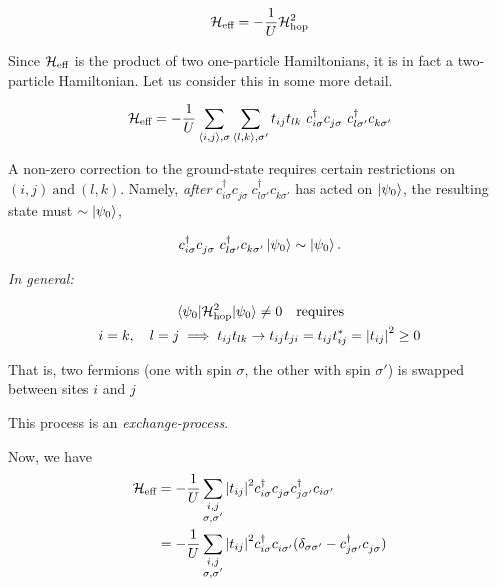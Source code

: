 \begin{equation}
    \mathcal{H}_{\text{eff}} = -\frac{1}{U} \mathcal{H}_{\text{hop}}^2
\end{equation}

Since $\mathcal{H}_{\text{eff}}$  is the product of two one-particle Hamiltonians, it is in fact a two-particle Hamiltonian. Let us consider this in some more detail.

\begin{equation}
    \mathcal{H}_{\text{eff}} = -\frac{1}{U} \sum_{\langle i, j \rangle, \sigma}  \sum_{\langle l, k \rangle , \sigma'} t_{ij} t_{lk} \ c_{i \sigma}^\dagger c_{j \sigma}^{} \ c_{l \sigma'}^\dagger c_{k \sigma'}^{}
\end{equation}

A non-zero correction to the ground-state requires certain restrictions on $(i, j) \ \text{and} \ (l,k)$. Namely, \emph{after} $c_{i \sigma}^\dagger c_{j \sigma}^{} \ c_{l \sigma'}^\dagger c_{k \sigma'}^{}$ has acted on $\ket{\psi_0}$, the resulting state must $\sim \ket{\psi_0}$,

\begin{equation}
    c_{i \sigma}^\dagger c_{j \sigma}^{} \ c_{l \sigma'}^\dagger c_{k \sigma'}^{} \ket{\psi_0} \sim \ket{\psi_0}.
\end{equation}

\emph{In general:}
\begin{center}
	
\end{center}
\begin{gather}
    \mel{\psi_0}{\mathcal{H}_{\text{hop}}^2}{\psi_0} \ne 0 \quad \text{requires} \\
    i = k, \quad l = j \implies t_{ij}t_{lk} \rightarrow t_{ij}t_{ji} = t_{ij}t_{ij}^* = \abs{t_{ij}}^2 \geq 0
\end{gather}

That is, two fermions (one with spin $\sigma$, the other with spin $\sigma'$) is swapped between sites $i$ and $j$ 

\begin{center}
	
\end{center}
This process is an \emph{exchange-process}.

Now, we have
\begin{align}
    \mathcal{H}_{\text{eff}} &= -\frac{1}{U} \sum_{\substack{i, j \\ \sigma, \sigma'}} \abs{t_{ij}}^2 c_{i \sigma}^\dagger c_{j \sigma}^{} c_{j \sigma'}^\dagger c_{i \sigma'} \\
    &= -\frac{1}{U} \sum_{\substack{i, j \\ \sigma, \sigma'}} \abs{t_{ij}}^2 c_{i \sigma}^\dagger c_{i \sigma'}^{} (\delta_{\sigma \sigma'} - c_{j \sigma'}^\dagger c_{j \sigma}^{})
\end{align}

